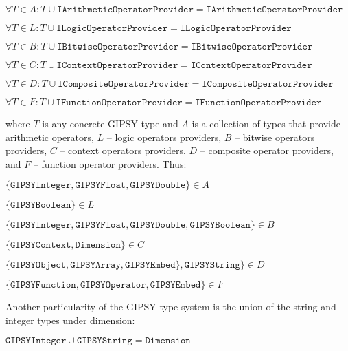 \documentclass{easychair}
\begin{document}
\vspace{3mm}
\begin{small}
$\forall T \in A: T \cup \mathtt{IArithmeticOperatorProvider} = \mathtt{IArithmeticOperatorProvider}$

$\forall T \in L: T \cup \mathtt{ILogicOperatorProvider} = \mathtt{ILogicOperatorProvider}$

$\forall T \in B: T \cup \mathtt{IBitwiseOperatorProvider} = \mathtt{IBitwiseOperatorProvider}$

$\forall T \in C: T \cup \mathtt{IContextOperatorProvider} = \mathtt{IContextOperatorProvider}$

$\forall T \in D: T \cup \mathtt{ICompositeOperatorProvider} = \mathtt{ICompositeOperatorProvider}$

$\forall T \in F: T \cup \mathtt{IFunctionOperatorProvider} = \mathtt{IFunctionOperatorProvider}$
\end{small}
\vspace{3mm}

\noindent
where $T$ is any concrete GIPSY type and $A$ is a collection of types
that provide arithmetic operators, $L$ -- logic operators providers, $B$ -- bitwise
operators providers,  $C$ -- context operators providers, $D$ -- composite operator providers,
and $F$ -- function operator providers. Thus:

\vspace{3mm}
\begin{small}
$\{\mathtt{GIPSYInteger}, \mathtt{GIPSYFloat}, \mathtt{GIPSYDouble}\} \in A$

$\{\mathtt{GIPSYBoolean}\} \in L$

$\{\mathtt{GIPSYInteger}, \mathtt{GIPSYFloat}, \mathtt{GIPSYDouble}, \mathtt{GIPSYBoolean}\} \in B$

$\{\mathtt{GIPSYContext}, \mathtt{Dimension}\} \in C$

$\{\mathtt{GIPSYObject}, \mathtt{GIPSYArray}, \mathtt{GIPSYEmbed}\}, \mathtt{GIPSYString}\} \in D$

$\{\mathtt{GIPSYFunction}, \mathtt{GIPSYOperator}, \mathtt{GIPSYEmbed}\} \in F$
\end{small}
\vspace{3mm}

\noindent
Another particularity of the GIPSY type system is the union of
the string and integer types under dimension:

\vspace{3mm}
$\mathtt{GIPSYInteger} \cup \mathtt{GIPSYString} = \mathtt{Dimension}$
\vspace{3mm}
\end{document}
